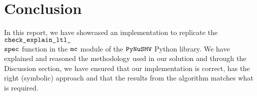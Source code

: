 \section{Conclusion}

In this report, we have showcased an implementation to replicate the $\verb|check_explain_ltl_|$\\$\verb|spec|$ function in the $\verb|mc|$ module of the $\verb|PyNuSMV|$ Python library. We have explained and reasoned the methodology used in our solution and through the Discussion section, we have ensured that our implementation is correct, has the right (symbolic) approach and that the results from the algorithm matches what is required.